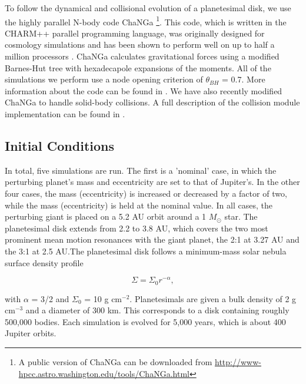 \documentclass[onecolumn]{aastex63}
\begin{document}
To follow the dynamical and collisional evolution of a planetesimal disk, we use the highly parallel N-body code {\sc ChaNGa} 
\footnote{A public version of {\sc ChaNGa} can be downloaded from \url{http://www-hpcc.astro.washington.edu/tools/ChaNGa.html}}. 
This code, which is written in the {\sc CHARM++} parallel programming language, was originally designed for cosmology simulations 
and has been shown to perform well on up to half a million processors \citep{2015AphCom..2..1}. {\sc ChaNGa} calculates 
gravitational forces using a modified Barnes-Hut \citep{1986Natur.324..446B} tree with hexadecapole expansions of the moments. 
All of the simulations we perform use a node opening criterion of $\theta_{BH}$ = 0.7. More information about the code can be found 
in \citet{2008IEEEpds...ChaNGa}. We have also recently modified {\sc ChaNGa} to handle solid-body collisions. A full description of 
the collision module implementation can be found in \citet{2019MNRAS.489.2159W}.

\subsection{Initial Conditions}\label{sec:ics}

In total, five simulations are run. The first is a 'nominal' case, in which the perturbing planet's mass and eccentricity are set to that of Jupiter's. 
In the other four cases, the mass (eccentricity) is increased or decreased by a factor of two, while the mass (eccentricity) is held at the nominal 
value. In all cases, the perturbing giant is placed on a 5.2 AU orbit around a 1 $M_{\odot}$ star. The planetesimal disk extends from 2.2 to 3.8 
AU, which covers the two most prominent mean motion resonances with the giant planet, the 2:1 at 3.27 AU and the 3:1 at 2.5 AU.The 
planetesimal disk follows a minimum-mass solar nebula surface density profile \citep{1981PThPS..70...35H}

\begin{equation}\label{eq:surf_den}
	\Sigma = \Sigma_{0} r^{-\alpha},
\end{equation}

\noindent with $\alpha$ = 3/2 and $\Sigma_{0}$ = 10 g cm$^{-2}$. Planetesimals are given a bulk density of 2 g cm$^{-3}$ and a diameter of 
300 km. This corresponds to a disk containing roughly 500,000 bodies. Each simulation is evolved for 5,000 years, which is about 400 Jupiter 
orbits.
\end{document}
